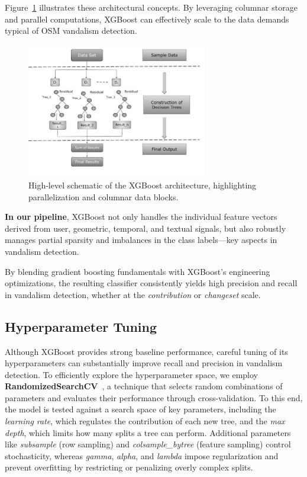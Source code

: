 \documentclass[
    13pt, %
    a4paper, %
    listof=totoc, %
    bibliography=totoc, %
    index=totoc, %
    headsepline
]{scrreprt}
\begin{document}
\noindent
Figure~\ref{fig:xgboost_architecture} illustrates these architectural concepts. By leveraging columnar storage and parallel computations, XGBoost can effectively scale to the data demands typical of OSM vandalism detection. 


\begin{figure}[H]
    \centering
    \includegraphics[width=0.7\textwidth]{xgboost-architecture.jpg}
    \caption{High-level schematic of the XGBoost architecture, highlighting parallelization and columnar data blocks.~\cite{tutorialspoint2025}}
    \label{fig:xgboost_architecture}
\end{figure}

\noindent
\textbf{In our pipeline}, XGBoost not only handles the individual feature vectors derived from user,
geometric, temporal, and textual signals, but also robustly manages partial sparsity
and imbalances in the class labels—key aspects in vandalism detection.

By blending gradient boosting fundamentals with XGBoost’s engineering optimizations, the resulting classifier consistently yields high precision and recall in vandalism detection, whether at the \emph{contribution} or \emph{changeset} scale.

\subsection{Hyperparameter Tuning}
\label{sec:hyperparameter_tuning}

Although XGBoost provides strong baseline performance, careful tuning of its hyperparameters can substantially improve recall and precision in vandalism detection. To efficiently explore the hyperparameter space, we employ \textbf{RandomizedSearchCV}~\cite{bergstra2012random}, a technique that selects random combinations of parameters and evaluates their performance through cross-validation. To this end, the model is tested against a search space of key parameters, including the \emph{learning rate}, which regulates the contribution of each new tree, and the \emph{max depth}, which limits how many splits a tree can perform. Additional parameters like \emph{subsample} (row sampling) and \emph{colsample\_bytree} (feature sampling) control stochasticity, whereas \emph{gamma}, \emph{alpha}, and \emph{lambda} impose regularization and prevent overfitting by restricting or penalizing overly complex splits.
\end{document}
